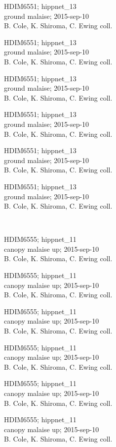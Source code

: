 \documentclass[2pt]{extarticle}
\begin{document}
\noindent
\parbox{0.16\textwidth}{\tiny \raggedright \rule[-0.3\baselineskip]{0pt}{10pt}HDIM6551; hippnet\_13\\ ground malaise; 2015-sep-10\\ B. Cole, K. Shiroma, C. Ewing coll.}
\parbox{0.16\textwidth}{\tiny \raggedright \rule[-0.3\baselineskip]{0pt}{10pt}HDIM6551; hippnet\_13\\ ground malaise; 2015-sep-10\\ B. Cole, K. Shiroma, C. Ewing coll.}
\parbox{0.16\textwidth}{\tiny \raggedright \rule[-0.3\baselineskip]{0pt}{10pt}HDIM6551; hippnet\_13\\ ground malaise; 2015-sep-10\\ B. Cole, K. Shiroma, C. Ewing coll.}
\parbox{0.16\textwidth}{\tiny \raggedright \rule[-0.3\baselineskip]{0pt}{10pt}HDIM6551; hippnet\_13\\ ground malaise; 2015-sep-10\\ B. Cole, K. Shiroma, C. Ewing coll.}
\parbox{0.16\textwidth}{\tiny \raggedright \rule[-0.3\baselineskip]{0pt}{10pt}HDIM6551; hippnet\_13\\ ground malaise; 2015-sep-10\\ B. Cole, K. Shiroma, C. Ewing coll.}
\parbox{0.16\textwidth}{\tiny \raggedright \rule[-0.3\baselineskip]{0pt}{10pt}HDIM6551; hippnet\_13\\ ground malaise; 2015-sep-10\\ B. Cole, K. Shiroma, C. Ewing coll.} \\ 
\vspace{0.001in} 

\noindent
\parbox{0.16\textwidth}{\tiny \raggedright \rule[-0.3\baselineskip]{0pt}{10pt}HDIM6555; hippnet\_11\\ canopy malaise up; 2015-sep-10\\ B. Cole, K. Shiroma, C. Ewing coll.}
\parbox{0.16\textwidth}{\tiny \raggedright \rule[-0.3\baselineskip]{0pt}{10pt}HDIM6555; hippnet\_11\\ canopy malaise up; 2015-sep-10\\ B. Cole, K. Shiroma, C. Ewing coll.}
\parbox{0.16\textwidth}{\tiny \raggedright \rule[-0.3\baselineskip]{0pt}{10pt}HDIM6555; hippnet\_11\\ canopy malaise up; 2015-sep-10\\ B. Cole, K. Shiroma, C. Ewing coll.}
\parbox{0.16\textwidth}{\tiny \raggedright \rule[-0.3\baselineskip]{0pt}{10pt}HDIM6555; hippnet\_11\\ canopy malaise up; 2015-sep-10\\ B. Cole, K. Shiroma, C. Ewing coll.}
\parbox{0.16\textwidth}{\tiny \raggedright \rule[-0.3\baselineskip]{0pt}{10pt}HDIM6555; hippnet\_11\\ canopy malaise up; 2015-sep-10\\ B. Cole, K. Shiroma, C. Ewing coll.}
\parbox{0.16\textwidth}{\tiny \raggedright \rule[-0.3\baselineskip]{0pt}{10pt}HDIM6555; hippnet\_11\\ canopy malaise up; 2015-sep-10\\ B. Cole, K. Shiroma, C. Ewing coll.} \\ 
\vspace{0.001in} 
\end{document}
